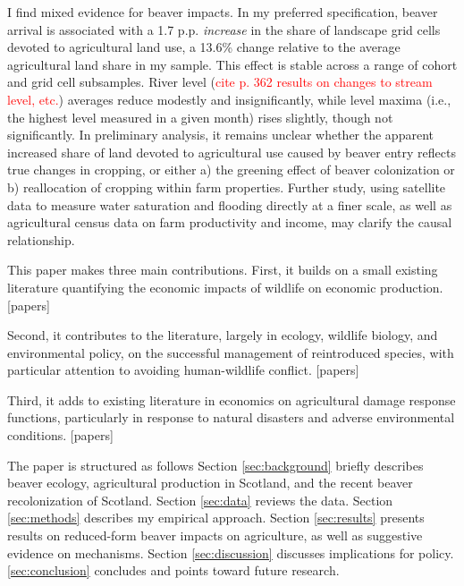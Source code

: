 I find mixed evidence for beaver impacts. In my preferred specification, beaver arrival is associated with a 1.7 p.p. \textit{increase} in the share of landscape grid cells devoted to agricultural land use, a 13.6\% change relative to the average agricultural land share in my sample. This effect is stable across a range of cohort and grid cell subsamples. River level (\textcolor{red}{cite \cite{swinnen_environmental_2019} p. 362 results on changes to stream level, etc.}) averages reduce modestly and insignificantly, while level maxima (i.e., the highest level measured in a given month) rises slightly, though not significantly. In preliminary analysis, it remains unclear whether the apparent increased share of land devoted to agricultural use caused by beaver entry reflects true changes in cropping, or either a) the greening effect of beaver colonization or b) reallocation of cropping within farm properties. Further study, using satellite data to measure water saturation and flooding directly at a finer scale, as well as agricultural census data on farm productivity and income, may clarify the causal relationship.

This paper makes three main contributions. First, it builds on a small existing literature quantifying the economic impacts of wildlife on economic production. [papers]

Second, it contributes to the literature, largely in ecology, wildlife biology, and environmental policy, on the successful management of reintroduced species, with particular attention to avoiding human-wildlife conflict. [papers]

Third, it adds to existing literature in economics on agricultural damage response functions, particularly in response to natural disasters and adverse environmental conditions. [papers]

The paper is structured as follows Section \ref{sec:background} briefly describes beaver ecology, agricultural production in Scotland, and the recent beaver recolonization of Scotland. Section \ref{sec:data} reviews the data. Section \ref{sec:methods} describes my empirical approach. Section \ref{sec:results} presents results on reduced-form beaver impacts on agriculture, as well as suggestive evidence on mechanisms. Section \ref{sec:discussion} discusses implications for policy. \ref{sec:conclusion} concludes and points toward future research.